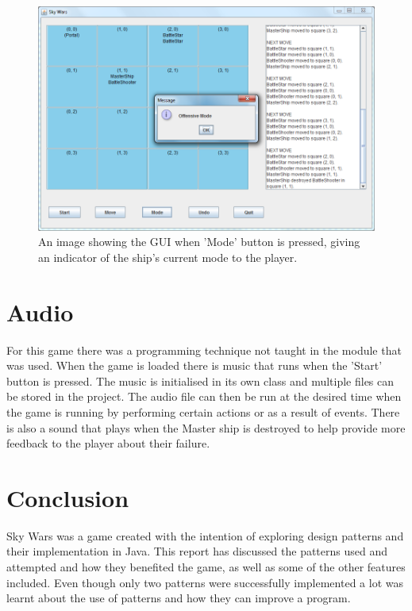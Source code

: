 \documentclass[conference,backref=page]{acmsiggraph}
\begin{document}
\begin{figure}[h]
	\includegraphics[width=\columnwidth]{images/gui2.png}
	\caption{An image showing the GUI when 'Mode' button is pressed, giving an indicator of the ship's current mode to the player.}
	\label{gui2}
\end{figure}

\section{Audio}
For this game there was a programming technique not taught in the module that was used. When the game is loaded there is music that runs when the 'Start' button is pressed. The music is initialised in its own class and multiple files can be stored in the project. The audio file can then be run at the desired time when the game is running by performing certain actions or as a result of events. There is also a sound that plays when the Master ship is destroyed to help provide more feedback to the player about their failure.

\section{Conclusion}
Sky Wars was a game created with the intention of exploring design patterns and their implementation in Java. This report has discussed the patterns used and attempted and how they benefited the game, as well as some of the other features included. Even though only two patterns were successfully implemented a lot was learnt about the use of patterns and how they can improve a program.
\end{document}
